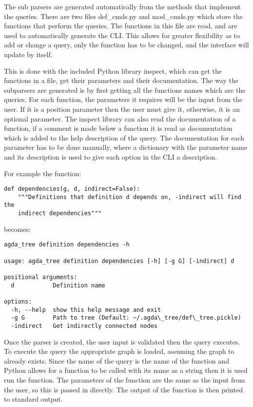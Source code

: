 
The sub parsers are generated automatically from the methods that implement the
queries. There are two files def\_cmds.py and mod\_cmds.py which store the functions
that perform the queries. The functions in this file are read, and are used to
automatically generate the CLI. This allows for greater flexibility as to add
or change a query, only the function has to be changed, and the interface will
update by itself.

This is done with the included Python library inspect, which can get the
functions in a file, get their parameters and their documentation. The way the
subparsers are generated is by first getting all the functions names which are
the queries. For each function, the parameters it requires will be the input
from the user. If it is a position parameter then the user must give it,
otherwise, it is an optional parameter. The inspect library can also read the
documentation of a function, if a comment is made below a function it is read
as documentation which is added to the help description of the query. The
documentation for each parameter has to be done manually, where a dictionary
with the parameter name and its description is used to give each option in the
CLI a description.

For example the function:

\begin{lstlisting}
def dependencies(g, d, indirect=False):
    """Definitions that definition d depends on, -indirect will find the
    indirect dependencies"""
\end{lstlisting}

becomes:

\begin{lstlisting}
agda_tree definition dependencies -h

usage: agda_tree definition dependencies [-h] [-g G] [-indirect] d

positional arguments:
  d           Definition name

options:
  -h, --help  show this help message and exit
  -g G        Path to tree (Default: ~/.agda\_tree/def\_tree.pickle)
  -indirect   Get indirectly connected nodes
\end{lstlisting}

Once the parser is created, the user input is validated then the query
executes. To execute the query the appropriate graph is loaded, assuming the
graph to already exists. Since the name of the query is the name of the
function and Python allows for a function to be called with its name as a
string then it is used run the function. The parameters of the function are the
same as the input from the user, so this is passed in directly. The output of
the function is then printed to standard output.

